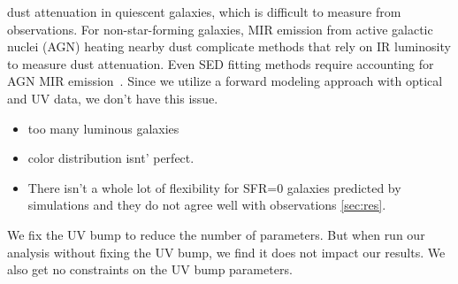dust attenuation in quiescent galaxies, which is difficult to measure from
observations. For non-star-forming galaxies, MIR emission from active galactic nuclei (AGN)
heating nearby dust complicate methods that rely on IR luminosity to measure
dust attenuation. Even SED fitting methods require accounting for AGN MIR 
emission~\citep{salim2016, leja2018, salim2018}. 
Since we utilize a forward modeling approach with optical and UV data, we don't
have this issue. 





\begin{itemize}
    \item too many luminous galaxies
    \item color distribution isnt' perfect. 
    \item There isn't a whole lot of flexibility for SFR=0 galaxies predicted by
    simulations and they do not agree well with observations \ref{sec:res}. 
\end{itemize}


We fix the UV bump to reduce the number of parameters. But when run our
analysis without fixing the UV bump, we find it does not impact our results.
We also get no constraints on the UV bump parameters. 


